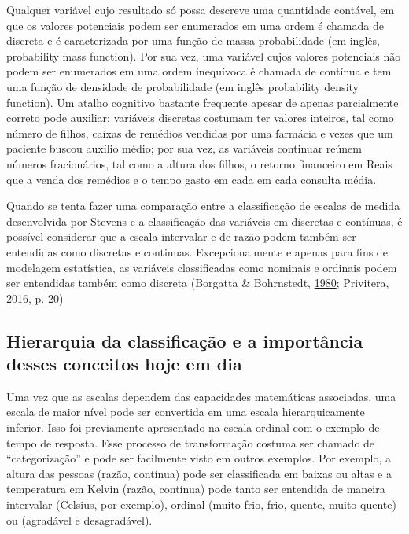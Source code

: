 \documentclass[
]{book}
\begin{document}
Qualquer variável cujo resultado só possa descreve uma quantidade
contável, em que os valores potenciais podem ser enumerados em uma ordem
é chamada de discreta e é caracterizada por uma função de massa
probabilidade (em inglês, probability mass function). Por sua vez, uma
variável cujos valores potenciais não podem ser enumerados em uma ordem
inequívoca é chamada de contínua e tem uma função de densidade de
probabilidade (em inglês probability density function). Um atalho
cognitivo bastante frequente apesar de apenas parcialmente correto pode
auxiliar: variáveis discretas costumam ter valores inteiros, tal como
número de filhos, caixas de remédios vendidas por uma farmácia e vezes
que um paciente buscou auxílio médio; por sua vez, as variáveis
continuar reúnem números fracionários, tal como a altura dos filhos, o
retorno financeiro em Reais que a venda dos remédios e o tempo gasto em
cada em cada consulta média.

Quando se tenta fazer uma comparação entre a classificação de escalas de
medida desenvolvida por Stevens e a classificação das variáveis em
discretas e contínuas, é possível considerar que a escala intervalar e
de razão podem também ser entendidas como discretas e continuas.
Excepcionalmente e apenas para fins de modelagem estatística, as
variáveis classificadas como nominais e ordinais podem ser entendidas
também como discreta (Borgatta \& Bohrnstedt,
\protect\hyperlink{ref-Borgatta1980}{1980}; Privitera,
\protect\hyperlink{ref-privitera2016}{2016}, p. 20)

\hypertarget{hierarquia-da-classificauxe7uxe3o-e-a-importuxe2ncia-desses-conceitos-hoje-em-dia}{%
\subsection{Hierarquia da classificação e a importância desses conceitos
hoje em
dia}\label{hierarquia-da-classificauxe7uxe3o-e-a-importuxe2ncia-desses-conceitos-hoje-em-dia}}

Uma vez que as escalas dependem das capacidades matemáticas associadas,
uma escala de maior nível pode ser convertida em uma escala
hierarquicamente inferior. Isso foi previamente apresentado na escala
ordinal com o exemplo de tempo de resposta. Esse processo de
transformação costuma ser chamado de ``categorização'' e pode ser
facilmente visto em outros exemplos. Por exemplo, a altura das pessoas
(razão, contínua) pode ser classificada em baixas ou altas e a
temperatura em Kelvin (razão, contínua) pode tanto ser entendida de
maneira intervalar (Celsius, por exemplo), ordinal (muito frio, frio,
quente, muito quente) ou (agradável e desagradável).
\end{document}
